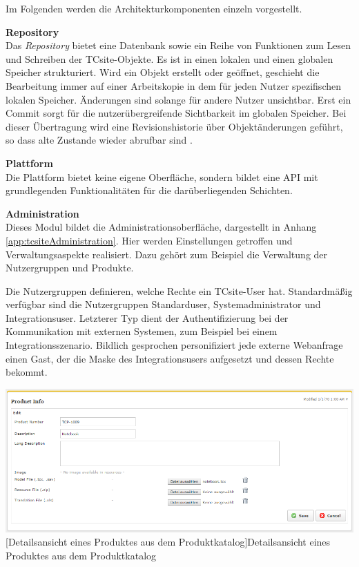 \documentclass[11pt, a4paper, titlepage, listof=totoc, bibliography=totoc, index=totoc, twoside, openright, headings=normal, draft]{scrreprt}
\begin{document}
Im Folgenden werden die Architekturkomponenten einzeln vorgestellt.

\textbf{Repository}\\
Das \emph{Repository} bietet eine Datenbank sowie ein Reihe von Funktionen zum Lesen und Schreiben der TCsite-Objekte. Es ist in einen lokalen und einen globalen Speicher strukturiert. Wird ein Objekt erstellt oder geöffnet, geschieht die Bearbeitung immer auf einer Arbeitskopie in dem für jeden Nutzer spezifischen lokalen Speicher. Änderungen sind solange für andere Nutzer unsichtbar. Erst ein \glqq Commit\grqq{} sorgt für die nutzerübergreifende Sichtbarkeit im globalen Speicher. Bei dieser Übertragung wird eine Revisionshistorie über Objektänderungen geführt, so dass alte Zustande wieder abrufbar sind \citep{tactonTCsiteDevelopmentManual}.

\textbf{Plattform}\\
Die Plattform bietet keine eigene Oberfläche, sondern bildet eine \ac{API} mit grundlegenden Funktionalitäten für die darüberliegenden Schichten.

\textbf{Administration}\\
Dieses Modul bildet die Administrationsoberfläche, dargestellt in Anhang \ref{app:tcsiteAdministration}. Hier werden Einstellungen getroffen und Verwaltungsaspekte realisiert. Dazu gehört zum Beispiel die Verwaltung der Nutzergruppen und Produkte.

Die Nutzergruppen definieren, welche Rechte ein TCsite-User hat. Standardmäßig verfügbar sind die Nutzergruppen \glqq Standarduser\grqq{}, \glqq Systemadministrator\grqq{} und \glqq Integrationsuser\grqq{}. Letzterer Typ dient der Authentifizierung bei der Kommunikation mit externen Systemen, zum Beispiel bei einem Integrationsszenario. Bildlich gesprochen personifiziert jede externe Webanfrage einen Gast, der die Maske des Integrationsusers aufgesetzt und dessen Rechte bekommt.

\vspace{1em}
\begin{minipage}{\linewidth}
	\centering
	\includegraphics[width=1\linewidth]{Abbildungen/tcsiteAdministrationProduct.PNG}
	[Detailsansicht eines Produktes aus dem Produktkatalog]{Detailsansicht eines Produktes aus dem Produktkatalog}
	\label{fig:tcsiteAdministrationProduct}
\end{minipage}
\vspace{0.3em}
\end{document}
